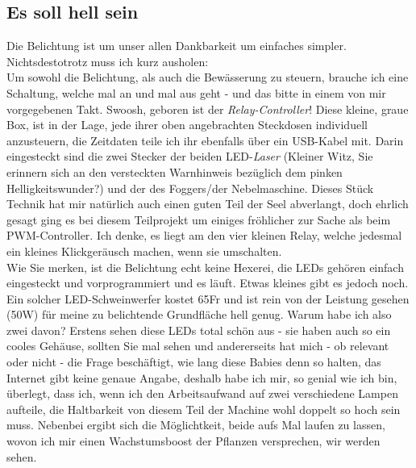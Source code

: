 \documentclass[12pt,titlepage,a4paper]{article}
\begin{document}
\subsection{Es soll hell sein}
Die Belichtung ist um unser allen Dankbarkeit um einfaches simpler. Nichtsdestotrotz muss ich kurz ausholen:\\ Um sowohl die Belichtung, als auch die Bewässerung zu steuern, brauche ich eine Schaltung, welche mal an und mal aus geht - und das bitte in einem von mir vorgegebenen Takt. Swoosh, geboren ist der \textit{Relay-Controller}! Diese kleine, graue Box, ist in der Lage, jede ihrer oben angebrachten Steckdosen individuell anzusteuern, die Zeitdaten teile ich ihr ebenfalls über ein USB-Kabel mit. Darin eingesteckt sind die zwei Stecker der beiden LED-\textit{Laser} (Kleiner Witz, Sie erinnern sich an den versteckten Warnhinweis bezüglich dem pinken Helligkeitswunder?) und der des Foggers/der Nebelmaschine. Dieses Stück Technik hat mir natürlich auch einen guten Teil der Seel abverlangt, doch ehrlich gesagt ging es bei diesem Teilprojekt um einiges fröhlicher zur Sache als beim PWM-Controller. Ich denke, es liegt am den vier kleinen Relay, welche jedesmal ein kleines Klickgeräusch machen, wenn sie umschalten.  \\Wie Sie merken, ist die Belichtung echt keine Hexerei, die LEDs gehören einfach eingesteckt und vorprogrammiert und es läuft. Etwas kleines gibt es jedoch noch. Ein solcher LED-Schweinwerfer kostet 65Fr und ist rein von der Leistung gesehen (50W) für meine zu belichtende Grundfläche hell genug. Warum habe ich also zwei davon? Erstens sehen diese LEDs total schön aus - sie haben auch so ein cooles Gehäuse, sollten Sie mal sehen und andererseits hat mich - ob relevant oder nicht - die Frage beschäftigt, wie lang diese Babies denn so halten, das Internet gibt keine genaue Angabe, deshalb habe ich mir, so genial wie ich bin, überlegt, dass ich, wenn ich den Arbeitsaufwand auf zwei verschiedene Lampen aufteile, die Haltbarkeit von diesem Teil der Machine wohl doppelt so hoch sein muss. Nebenbei ergibt sich die Möglichtkeit, beide aufs Mal laufen zu lassen, wovon ich mir einen Wachstumsboost der Pflanzen versprechen, wir werden sehen.
\end{document}
